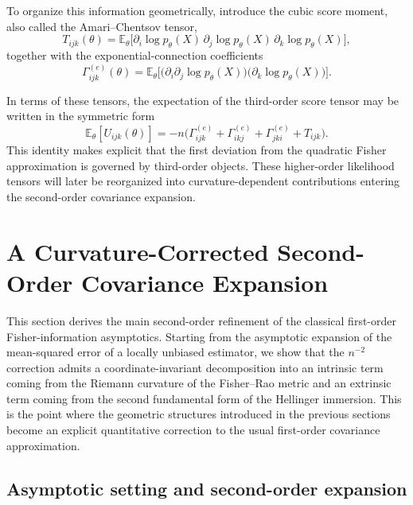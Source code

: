 \documentclass[11pt,letterpaper]{amsart}
\numberwithin{equation}{section}
\theoremstyle{plain}
\theoremstyle{definition}
\theoremstyle{remark}
\begin{document}
To organize this information geometrically, introduce the cubic score moment, also called the Amari--Chentsov tensor,
\begin{equation*}
T_{ijk}(\theta)
=
\mathbb{E}_\theta\!\big[
\partial_i\log p_\theta(X)\,
\partial_j\log p_\theta(X)\,
\partial_k\log p_\theta(X)
\big],
\end{equation*}
together with the exponential-connection coefficients
\begin{equation*}
\Gamma^{(e)}_{ijk}(\theta)
=
\mathbb{E}_\theta\!\Big[
\big(\partial_i\partial_j\log p_\theta(X)\big)
\big(\partial_k\log p_\theta(X)\big)
\Big].
\end{equation*}

In terms of these tensors, the expectation of the third-order score tensor may be written in the symmetric form
\begin{equation*}
\mathbb{E}_\theta[U_{ijk}(\theta)]
=
-n\Big(
\Gamma^{(e)}_{ijk}
+
\Gamma^{(e)}_{ikj}
+
\Gamma^{(e)}_{jki}
+
T_{ijk}
\Big).
\end{equation*}
This identity makes explicit that the first deviation from the quadratic Fisher approximation is governed by third-order objects. These higher-order likelihood tensors will later be reorganized into curvature-dependent contributions entering the second-order covariance expansion.

\section{A Curvature-Corrected Second-Order Covariance Expansion}\label{curvature_corrected_CRLB}

This section derives the main second-order refinement of the classical first-order Fisher-information asymptotics. Starting from the asymptotic expansion of the mean-squared error of a locally unbiased estimator, we show that the \(n^{-2}\) correction admits a coordinate-invariant decomposition into an intrinsic term coming from the Riemann curvature of the Fisher--Rao metric and an extrinsic term coming from the second fundamental form of the Hellinger immersion. This is the point where the geometric structures introduced in the previous sections become an explicit quantitative correction to the usual first-order covariance approximation.

\subsection{Asymptotic setting and second-order expansion}
\end{document}
